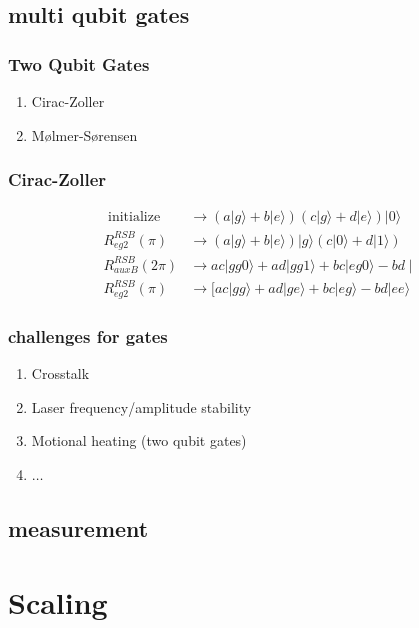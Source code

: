 \documentclass[18 pt]{beamer}
\begin{document}
\subsection{multi qubit gates}
\begin{frame}
  \frametitle{Two Qubit Gates}
  \begin{enumerate}
    \item Cirac-Zoller
    \item Mølmer-Sørensen
  \end{enumerate}
\end{frame}
\begin{frame}
  \frametitle{Cirac-Zoller}
  \begin{align}
    \text { initialize } & \rightarrow(a|g\rangle+b|e\rangle)(c|g\rangle+d|e\rangle)|0\rangle \\
    R_{e g 2}^{R S B}(\pi) & \rightarrow(a|g\rangle+b|e\rangle)|g\rangle(c|0\rangle+d|1\rangle) \\
    R_{a u x B}^{R S B}(2 \pi) & \rightarrow a c|g g 0\rangle+a d|g g 1\rangle+b c|e g 0\rangle-b d \mid \\
    R_{e g 2}^{R S B}(\pi) & \rightarrow[a c|g g\rangle+a d|g e\rangle+b c|e g\rangle-b d|e e\rangle
    \end{align}
\end{frame}
\begin{frame}
  \frametitle{challenges for gates}
  \begin{enumerate}
    \item Crosstalk
    \item Laser frequency/amplitude stability
    \item Motional heating (two qubit gates)
    \item \(\dots\)
  \end{enumerate}
\end{frame}
\subsection{measurement}
\section{Scaling}
\end{document}
